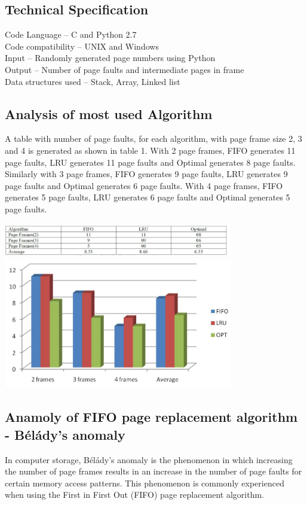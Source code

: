 \documentclass[12pt]{article}
\begin{document}
	\begin{flushleft}
	\section{Technical Specification}
	
	Code Language – C and Python 2.7\\
	Code compatibility – UNIX and Windows\\
	Input – Randomly generated page numbers using Python\\
	Output – Number of page faults and intermediate pages in frame\\
	Data structures used – Stack, Array, Linked list\\
	\pagebreak
	\end{flushleft}	
	\begin{flushleft}
		\section{Analysis of most used Algorithm}
	A table with number of page faults, for each algorithm, with page frame size 2, 3 and 4 is generated as shown in table 1. With 2 page frames, FIFO generates 11 page faults, LRU generates 11 page faults and Optimal generates 8 page faults. Similarly with 3 page frames, FIFO generates 9 page faults, LRU generates 9 page faults and Optimal generates 6 page faults. With 4 page frames, FIFO generates 5 page faults, LRU generates 6 page faults and Optimal generates 5 page faults.
	\end{flushleft}
	\includegraphics[width=10cm]{Analysis.JPG}\\
	\vspace{2cm}
	\includegraphics[width=10cm]{Analysis_Graph.JPG}
	\pagebreak
	\begin{flushleft}
		\section{Anamoly of FIFO page replacement algorithm - Bélády's anomaly}
	In computer storage, Bélády's anomaly is the phenomenon in which increasing the number of page frames results in an increase in the number of page faults for certain memory access patterns. This phenomenon is commonly experienced when using the First in First Out (FIFO) page replacement algorithm. 
	
	\end{flushleft}
\end{document}

